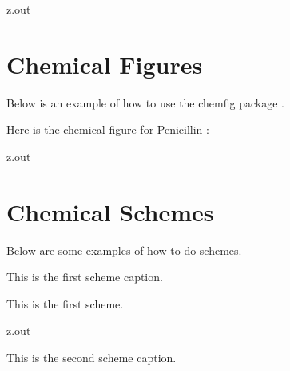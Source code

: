 \MyIO


\begin{VerbatimOut}{z.out}


\section{Chemical Figures}

Below is an example of how to use the chemfig package \cite{tellechea2021}.

Here is the chemical figure
for Penicillin \cite[pages~72--73]{tellechea2021}:\\

\end{VerbatimOut}

\MyIO


\begin{VerbatimOut}{z.out}
\newpage
\section{Chemical Schemes}

Below are some examples of how to do schemes.

\begin{scheme}[ht]
  \caption{This is the first scheme caption.}
  \vspace*{6pt}
  \begin{center}
    This is the first scheme.
  \end{center}
\end{scheme}
\end{VerbatimOut}

\MyIO


\begin{VerbatimOut}{z.out}
\begin{scheme}[ht]
  \caption{This is the second scheme caption.}
  \vspace*{6pt}
  \begin{center}
    \scriptsize{}
    \schemestart
      \arrow
    \schemestop
  \end{center}
\end{scheme}
\end{VerbatimOut}

